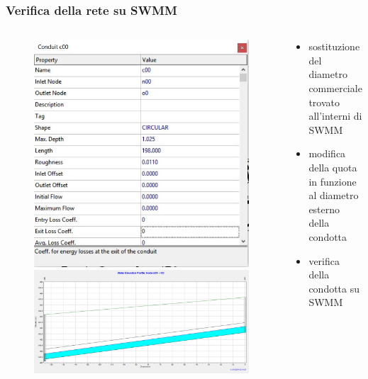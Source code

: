\documentclass{beamer}
\begin{document}
\begin{frame}
 \frametitle{Verifica della rete su SWMM}
 
 \begin{columns}
  \begin{column}{.5\textwidth}
  \begin{figure}
   \centering
   \begin{overprint}
     \includegraphics[width=\linewidth]{images/sostituzione_diametro}
     \includegraphics[width=.98\linewidth]{images/verifica_condotta}
   \end{overprint}
  \end{figure}   
  \end{column}
  
  \begin{column}{.5\textwidth}
   \begin{itemize}
    \item sostituzione del diametro commerciale trovato all'interni di SWMM
   \item modifica della quota in funzione al diametro esterno della condotta
    \item verifica della condotta su SWMM   
   \end{itemize}
  \end{column}
 \end{columns}
\end{frame}
\end{document}
